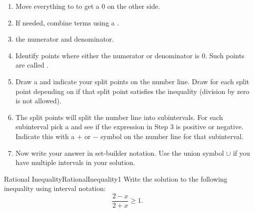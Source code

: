 \begin{formulabox}
\begin{enumerate}\itemsep0em 
	\item Move everything to  to get a $0$ on the other side.
	\item If needed, combine terms using a .
	\item {} the numerator and denominator.
	\item Identify points where either the numerator or denominator is $0$. Such points
				are called .
	\item Draw a  and indicate your split points on the number line. 
				Draw  for each split point depending on 
				if that split point satisfies the inequality (division by zero is not allowed).
	\item The split points will split the number line into subintervals. For each 
				subinterval pick a  and see if the expression in Step 3 
				is positive or negative. Indicate this with a $+$ or $-$ symbol on the 
				number line for that subinterval.
	\item Now write your answer in set-builder notation. Use the union symbol 
				$\cup$ if you have multiple intervals in your solution.
\end{enumerate}
\end{formulabox}

\begin{example}{Rational Inequality}{RationalInequality1}
Write the solution to the following inequality using interval notation:
\[\frac{2-x}{2+x}\geq 1.\]
\vspace{-0.5cm}
\end{example}

